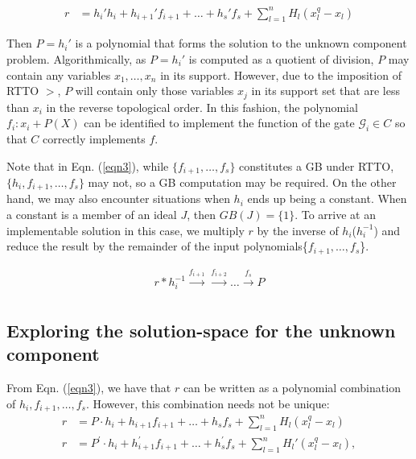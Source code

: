 \begin{align}
r & = h_i'h_i+h_{i+1}'f_{i+1}+\dots+h_s'f_s+ \sum_{l=1}^n H_l (x_l^q-x_l)
\end{align}

Then $P = h_i'$ is a polynomial that forms the solution to the
unknown component problem. Algorithmically, as $P = h_i'$ is computed
as a quotient of division, $P$ may contain any variables
$x_1,\dots,x_n$ in its support. However, due to the imposition of RTTO
$>$, $P$ will contain only those variables $x_j$ in its support set
that are less than $x_i$ in the reverse topological order. In this
fashion, the polynomial $f_i: x_i + P(X)$ can be identified to
implement the function of the gate $\mathcal{G}_i \in C$ so that $C$
correctly implements $f$. 

Note that in Eqn. (\ref{eqn3}), while $\{f_{i+1},\dots,f_s\}$
constitutes a GB under RTTO, $\{h_i,f_{i+1},\dots,f_s\}$
may not, so a GB computation may be required. On the other hand, we
may also encounter situations when $h_i$ ends up being a constant.
When a constant is a member of an ideal $J$, then $GB(J) = \{1\}$. To
arrive at an implementable solution in this case, we multiply $r$
by the inverse of $h_i$($h_i^{-1}$) and reduce the result by the
remainder of the input polynomials\{$f_{i+1},\dots,f_s$\}.  

\begin{align}
r*h_i^{-1}\xrightarrow[]{f_{i+1}}\xrightarrow[]{f_{i+2}}\dots\xrightarrow[]{f_s}P
\end{align}
\vspace{-0.3in}
\subsection{Exploring the solution-space for the unknown component}
From Eqn. (\ref{eqn3}), we have that $r$ can be written as a
polynomial combination of $h_i,f_{i+1},\dots, f_s$. However, this
combination needs not be unique:
\begin{align*}
r &= P\cdot h_i+h_{i+1}f_{i+1}+\dots+h_sf_s+ \sum_{l=1}^n H_l (x_l^q-x_l)\\
r&= P^{'}\cdot h_i+h_{i+1}^{'}f_{i+1}+\dots+h_s^{'}f_s+\sum_{l=1}^n H_l' (x_l^q-x_l),
\end{align*}


